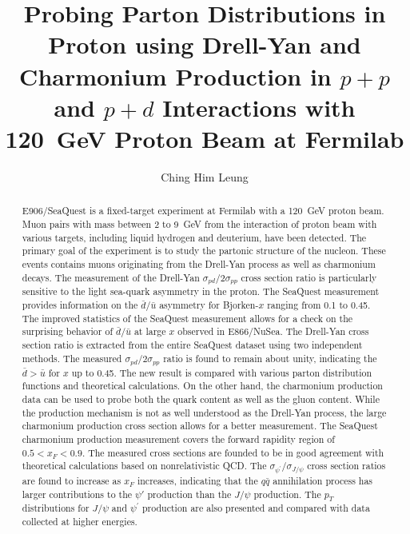 \documentclass[final]{uiucthesis2021}
\begin{document}
\title{Probing Parton Distributions in Proton using Drell-Yan and Charmonium Production
	in \texorpdfstring{$p+p$}{p+p} and \texorpdfstring{$p+d$}{p+d} Interactions with
	\texorpdfstring{\SI{120}{\GeV}}{120~GeV} Proton Beam at Fermilab}
\author{Ching Him Leung}

\phdthesis
{}
\maketitle
\frontmatter

\begin{abstract}
	E906/SeaQuest is a fixed-target experiment at Fermilab with a \SI{120}{\GeV} proton beam.
	Muon pairs with mass between \num{2} to \SI{9}{\GeV} from the
	interaction of proton beam with various targets,
	including liquid hydrogen and deuterium, have been detected.
	The primary goal of the experiment is to study the partonic structure of the nucleon.
	These events contains muons originating from the Drell-Yan process as well as charmonium decays.
	The measurement of the Drell-Yan $\sigma_{pd}/2\sigma_{pp}$ cross section
	ratio is particularly sensitive to the light sea-quark asymmetry in the proton.
	The SeaQuest measurement provides information on the $\bar{d}/\bar{u}$ asymmetry
	for  Bjorken-$x$ ranging from \num{0.1} to \num{0.45}.
	The improved statistics	of the SeaQuest measurement allows for a check on the surprising behavior of
	$\bar{d}/\bar{u}$ at large $x$ observed in E866/NuSea.
	The Drell-Yan cross section ratio is extracted from the entire SeaQuest dataset
	using two independent methods.
	The measured $\sigma_{pd}/2\sigma_{pp}$ ratio is found to remain about unity,
	indicating the $\bar{d}>\bar{u}$ for $x$ up to \num{0.45}.
	The new result is compared with various parton distribution functions and theoretical calculations.
	On the other hand, the charmonium production data can be used to probe both the quark
	content as well as the gluon content.
	While the production mechanism is not as well understood as the Drell-Yan process,
	the large charmonium production cross section allows for a better measurement.
	The SeaQuest charmonium production measurement covers the forward rapidity region of $0.5 < x_F <0.9$.
	The measured cross sections are founded to be in good agreement with
	theoretical calculations based on nonrelativistic QCD.
	The $\sigma_{\psi^\prime} / \sigma_{J/\psi}$ cross section ratios are found to increase as $x_F$ increases,
	indicating that the $q\bar{q}$ annihilation process has larger contributions to the
	$\psi'$ production than the $J/\psi$ production.
	The $p_T$ distributions for $J/\psi$ and $\psi^\prime$ production are also presented and
	compared with data collected at higher energies.
\end{abstract}
\end{document}
